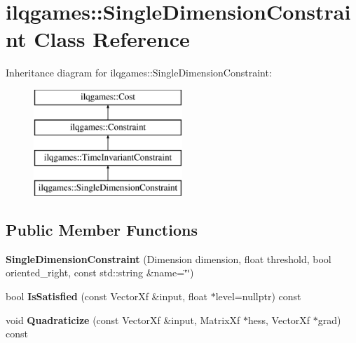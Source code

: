 \hypertarget{classilqgames_1_1_single_dimension_constraint}{}\section{ilqgames\+:\+:Single\+Dimension\+Constraint Class Reference}
\label{classilqgames_1_1_single_dimension_constraint}
Inheritance diagram for ilqgames\+:\+:Single\+Dimension\+Constraint\+:\begin{figure}[H]
\begin{center}
\leavevmode
\includegraphics[height=4.000000cm]{classilqgames_1_1_single_dimension_constraint}
\end{center}
\end{figure}
\subsection*{Public Member Functions}
\begin{DoxyCompactItemize}
\item 
{\bfseries Single\+Dimension\+Constraint} (Dimension dimension, float threshold, bool oriented\+\_\+right, const std\+::string \&name=\char`\"{}\char`\"{})\hypertarget{classilqgames_1_1_single_dimension_constraint_ac9f91e5938602c15b23b48756866b84e}{}\label{classilqgames_1_1_single_dimension_constraint_ac9f91e5938602c15b23b48756866b84e}

\item 
bool {\bfseries Is\+Satisfied} (const Vector\+Xf \&input, float $\ast$level=nullptr) const \hypertarget{classilqgames_1_1_single_dimension_constraint_a17cf10a6380cd6bf93523e3da37b1701}{}\label{classilqgames_1_1_single_dimension_constraint_a17cf10a6380cd6bf93523e3da37b1701}

\item 
void {\bfseries Quadraticize} (const Vector\+Xf \&input, Matrix\+Xf $\ast$hess, Vector\+Xf $\ast$grad) const \hypertarget{classilqgames_1_1_single_dimension_constraint_a4079f6f9af8858c0520d60133a5ef3fb}{}\label{classilqgames_1_1_single_dimension_constraint_a4079f6f9af8858c0520d60133a5ef3fb}

\end{DoxyCompactItemize}
